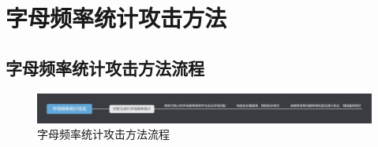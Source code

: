 \section{字母频率统计攻击方法}

\subsection{字母频率统计攻击方法流程}
\begin{figure}[thbp!]
	\centering
	\includegraphics[width=16cm]{figure/figure3.png}
	\caption{字母频率统计攻击方法流程}
	\label{fig:字母频率统计攻击方法流程}
\end{figure}

